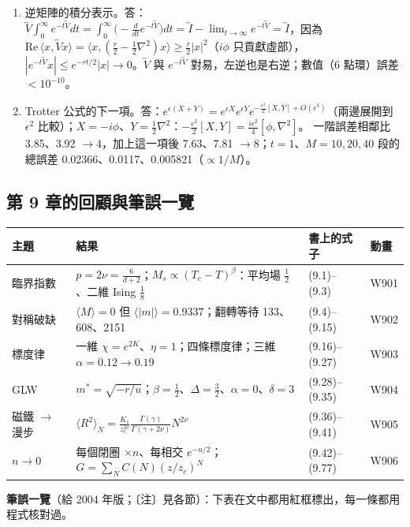 {\begin{enumerate}[label=\textbf{9.\arabic*},itemsep=0.05em]
\item 逆矩陣的積分表示。\quad 答：$\overleftrightarrow V\int_0^\infty e^{-t\overleftrightarrow V}dt=\int_0^\infty\big(-\frac d{dt}e^{-t\overleftrightarrow V}\big)dt=\overleftrightarrow I-\lim_{t\to\infty}e^{-t\overleftrightarrow V}=\overleftrightarrow I$，因為
$\mathrm{Re}\,\langle x,\overleftrightarrow Vx\rangle=\langle x,(\frac r2-\frac12\nabla^2)x\rangle\ge\frac r2|x|^2$（$i\phi$ 只貢獻虛部），$|e^{-t\overleftrightarrow V}x|\le e^{-rt/2}|x|\to0$。$\overleftrightarrow V$ 與 $e^{-t\overleftrightarrow V}$ 對易，左逆也是右逆；數值（6 點環）誤差 $<10^{-10}$。
\item Trotter 公式的下一項。\quad 答：$e^{\epsilon(X+Y)}=e^{\epsilon X}e^{\epsilon Y}e^{-\frac{\epsilon^2}2[X,Y]+O(\epsilon^3)}$（兩邊展開到 $\epsilon^2$ 比較）；$X=-i\phi$、$Y=\frac12\nabla^2$：$-\frac{\epsilon^2}2[X,Y]=\frac{i\epsilon^2}4[\phi,\nabla^2]$。
一階誤差相鄰比 3.85、3.92 $\to4$，加上這一項後 7.63、7.81 $\to8$；$t=1$、$M=10,20,40$ 段的總誤差 0.02366、0.0117、0.005821（$\propto1/M$）。
\end{enumerate}}

\subsection{第 9 章的回顧與筆誤一覽}
\begin{center}
\small\setlength{\tabcolsep}{4pt}
\begin{tabular}{@{}llll@{}}
\toprule
主題 & 結果 & 書上的式子 & 動畫\\
\midrule
臨界指數 & $p=2\nu=\frac6{d+2}$；$M_s\propto(T_c-T)^\beta$：平均場 $\frac12$、二維 Ising $\frac18$ & (9.1)--(9.3) & W901\\
對稱破缺 & $\langle M\rangle=0$ 但 $\langle|m|\rangle=0.9337$；翻轉等待 133、608、2151 & (9.4)--(9.15) & W902\\
標度律 & 一維 $\chi=e^{2K}$、$\eta=1$；四條標度律；三維 $\alpha=0.12\to0.19$ & (9.16)--(9.27) & W903\\
GLW & $m^*=\sqrt{-r/u}$；$\beta=\frac12$、$\Delta=\frac32$、$\alpha=0$、$\delta=3$ & (9.28)--(9.35) & W904\\
磁鐵 $\to$ 漫步 & $\langle R^2\rangle_N=\frac{K_1}{z_c^{2\nu}}\frac{\Gamma(\gamma)}{\Gamma(\gamma+2\nu)}N^{2\nu}$ & (9.36)--(9.41) & W905\\
$n\to0$ & 每個閉圈 $\times n$、每相交 $e^{-u/2}$；$G=\sum_NC(N)(z/z_c)^N$ & (9.42)--(9.77) & W906\\
\bottomrule
\end{tabular}
\end{center}
\textbf{筆誤一覽}（給 2004 年版；〔注〕見各節）：下表在文中都用紅框標出，每一條都用程式核對過。
\begin{center}
\footnotesize\renewcommand{\arraystretch}{0.9}
\NineTabErrata
\end{center}
